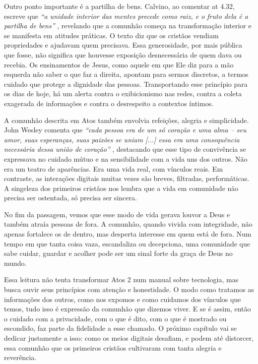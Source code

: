 Outro ponto importante é a partilha de bens. Calvino, ao comentar \gls{at} 4.32, escreve que \textit{``a unidade interior das mentes precede como raiz, e o fruto dela é a partilha de bens''} \cite{calvinoAtos4}, revelando que a comunhão começa na transformação interior e se manifesta em atitudes práticas. O texto diz que os cristãos vendiam propriedades e ajudavam quem precisava. Essa generosidade, por mais pública que fosse, não significa que houvesse exposição desnecessária de quem dava ou recebia. Os ensinamentos de Jesus, como aquele em que Ele diz para a mão esquerda não saber o que faz a direita, apontam para sermos discretos, a termos cuidado que protege a dignidade das pessoas. Transportando esse princípio para os dias de hoje, há um alerta contra o exibicionismo nas redes, contra a coleta exagerada de informações e contra o desrespeito a contextos íntimos.

A comunhão descrita em Atos também envolvia refeições, alegria e simplicidade. John Wesley comenta que \textit{``cada pessoa era de um só coração e uma alma – seu amor, suas esperanças, suas paixões se uniam [...] essa era uma consequência necessária dessa união de coração''} \cite{wesleyAtos4}, destacando que esse tipo de convivência se expressava no cuidado mútuo e na sensibilidade com a vida uns dos outros. Não era um teatro de aparências. Era uma vida real, com vínculos reais. Em contraste, as interações digitais muitas vezes são breves, filtradas, performáticas. A singeleza dos primeiros cristãos nos lembra que a vida em comunidade não precisa ser ostentada, só precisa ser sincera.

No fim da passagem, vemos que esse modo de vida gerava louvor a Deus e também atraía pessoas de fora. A comunhão, quando vivida com integridade, não apenas fortalece os de dentro, mas desperta interesse em quem está de fora. Num tempo em que tanta coisa vaza, escandaliza ou decepciona, uma comunidade que sabe cuidar, guardar e acolher pode ser um sinal forte da graça de Deus no mundo.

Essa leitura não tenta transformar Atos 2 num manual sobre tecnologia, mas busca ouvir seus princípios com atenção e honestidade. O modo como tratamos as informações dos outros, como nos expomos e como cuidamos dos vínculos que temos, tudo isso é expressão da comunhão que dizemos viver. E se é assim, então o cuidado com a privacidade, com o que é dito, com o que é mostrado ou escondido, faz parte da fidelidade a esse chamado. O próximo capítulo vai se dedicar justamente a isso: como os meios digitais desafiam, e podem até distorcer, essa comunhão que os primeiros cristãos cultivaram com tanta alegria e reverência.

